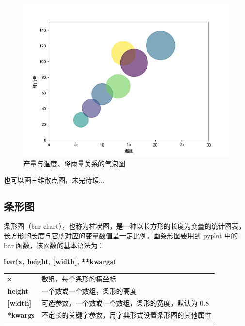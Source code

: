 \begin{figure}[!ht]
  \centering
  \includegraphics[scale=0.8]{figure/scatter2.png}
  \caption{产量与温度、降雨量关系的气泡图}\label{fig:scatter2}
\end{figure}

也可以画三维散点图，未完待续...

\clearpage

\subsection{条形图}

条形图（bar chart），也称为柱状图，是一种以长方形的长度为变量的统计图表，长方形的长度与它所对应的变量数值呈一定比例。画条形图要用到 pyplot 中的 bar 函数，该函数的基本语法为：

\begin{center}
\begin{tcolorbox}[title = bar 函数的语法]
\textbf{bar(x, height, [width],  **kwargs)}
\tcblower
\vspace{10pt}

\begin{tcboutputlisting}
\begin{tabular}{>{\bfseries}ll}
  x &数组，每个条形的横坐标\\
  height & 一个数或一个数组，条形的高度\\

[width] &可选参数，一个数或一个数组，条形的宽度，默认为 0.8\\

**kwargs &不定长的关键字参数，用字典形式设置条形图的其他属性
\end{tabular}
\end{tcboutputlisting}
\tcbuselistingtext
\end{tcolorbox}
\end{center}

